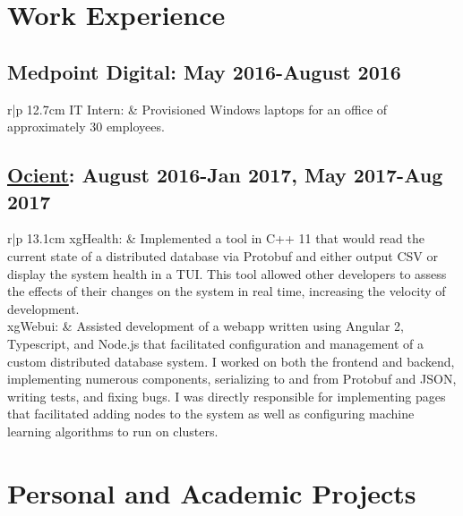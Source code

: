 \documentclass[a4paper,10pt]{article} %
\begin{document}


\section{Work Experience}
\subsection{Medpoint Digital: May 2016-August 2016}
\begin{tabular}{r|p {12.7cm}}
    IT Intern: & Provisioned Windows laptops for an office of approximately 30 employees.
\end{tabular}
\subsection{\href{http://www.ocient.com/}{Ocient}: August 2016-Jan 2017, May 2017-Aug 2017}
\begin{tabular}{r|p {13.1cm}}
    xgHealth: & Implemented a tool in C++ 11 that would read the current state of a distributed database via Protobuf and either output CSV or display the system health in a TUI. This tool allowed other developers to assess the effects of their changes on the system in real time, increasing the velocity of development.\\ 
    xgWebui: & Assisted development of a webapp written using Angular 2, Typescript, and Node.js that facilitated configuration and management of a custom distributed database system. I worked on both the frontend and backend, implementing numerous components, serializing to and from Protobuf and JSON, writing tests, and fixing bugs.
    I was directly responsible for implementing pages that facilitated adding nodes to the system as well as configuring machine learning algorithms to run on clusters.
\end{tabular}


\section{Personal and Academic Projects}
\end{document}
